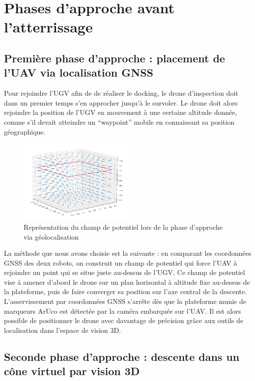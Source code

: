 \section{Phases d’approche avant l’atterrissage}

\subsection{Première phase d’approche : placement de l’UAV via localisation GNSS}

Pour rejoindre l’UGV afin de de réaliser le docking, le drone d’inspection doit dans un premier temps s’en approcher jusqu’à le survoler. Le drone doit alors rejoindre la position de l’UGV en mouvement à une certaine altitude donnée, comme s'il devait atteindre un “waypoint” mobile en connaissant sa position géographique.

\begin{figure}[H]
    \centering\includegraphics[width=0.5\textwidth]{images/phases_approche/potent_phase_1.png}
    \caption{Représentation du champ de potentiel lors de la phase d'approche via géolocalisation \cite{quiver}}
\end{figure}

La méthode que nous avons choisie est la suivante : en comparant les coordonnées GNSS des deux robots, on construit un champ de potentiel qui force l’UAV à rejoindre un point qui se situe juste au-dessus de l’UGV. Ce champ de potentiel vise à amener d’abord le drone sur un plan horizontal à altitude fixe au-dessus de la plateforme, puis de faire converger sa position sur l’axe central de la descente.
L'asservissement par coordonnées GNSS s’arrête dès que la plateforme munie de marqueurs ArUco est détectée par la caméra embarquée sur l’UAV. Il est alors possible de positionner le drone avec davantage de précision grâce aux outils de localisation dans l’espace de vision 3D.

\subsection{Seconde phase d’approche : descente dans un cône virtuel par vision 3D}

